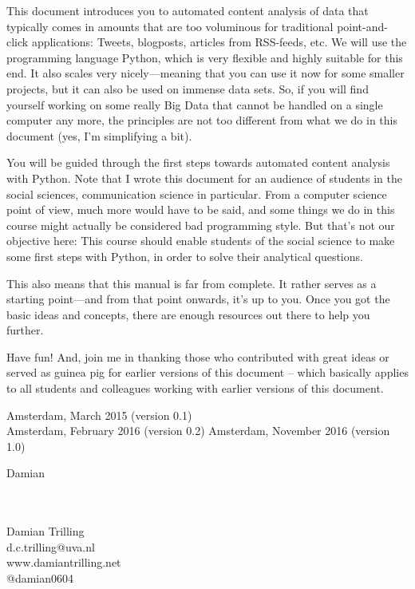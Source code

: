\documentclass[a4paper,12pt]{book}
\begin{document}
This document introduces you to automated content analysis of data that typically comes in amounts that are too voluminous for traditional point-and-click applications: Tweets, blogposts, articles from RSS-feeds, etc. We will use the programming language Python, which is very flexible and highly suitable for this end. It also scales very nicely---meaning that you can use it now for some smaller projects, but it can also be used on immense data sets. So, if you will find yourself working on some really Big Data that cannot be handled on a single computer any more, the principles are not too different from what we do in this document (yes, I'm simplifying a bit).

You will be guided through the first steps towards automated content analysis with Python. Note that I wrote this document for an audience of students in the social sciences, communication science in particular. From a computer science point of view, much more would have to be said, and some things we do in this course might actually be considered bad programming style. But that's not our objective here: This course should enable students of the social science to make some first steps with Python, in order to solve their analytical questions.

This also means that this manual is far from complete. It rather serves as a starting point---and from that point onwards, it's up to you. Once you got the basic ideas and concepts, there are enough resources out there to help you further.

Have fun! And, join me in thanking those who contributed with great ideas or served as guinea pig for earlier versions of this document -- which basically applies to all students and colleagues working with earlier versions of this document. 

\vspace{.5cm}

\begin{flushright}
Amsterdam, March 2015 (version 0.1)\\
Amsterdam, February 2016 (version 0.2)
Amsterdam, November 2016 (version 1.0)
\end{flushright}

Damian



\begin{flushright}
~\\~\\Damian Trilling\\
d.c.trilling@uva.nl\\
www.damiantrilling.net\\
@damian0604

\end{flushright}
\end{document}

